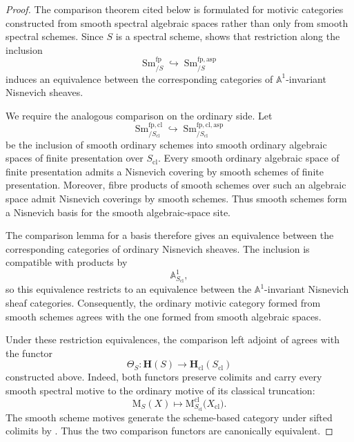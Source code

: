 \begin{proof}
The comparison theorem cited below is formulated for motivic
categories constructed from smooth spectral algebraic spaces rather
than only from smooth spectral schemes.  Since \(S\) is a spectral
scheme,
\cite[Corollary~2.4.5]{KhanBraveNewMotivicI}
shows that restriction along the inclusion
\[
    \operatorname{Sm}^{\mathrm{fp}}_{/S}
    \hookrightarrow
    \operatorname{Sm}^{\mathrm{fp},\mathrm{asp}}_{/S}
\]
induces an equivalence between the corresponding categories of
\(\mathbb A^1\)-invariant Nisnevich sheaves.

We require the analogous comparison on the ordinary side.  Let
\[
    \operatorname{Sm}^{\mathrm{fp},\mathrm{cl}}_{/S_{\mathrm{cl}}}
    \hookrightarrow
    \operatorname{Sm}^{\mathrm{fp},\mathrm{cl},\mathrm{asp}}_
    {/S_{\mathrm{cl}}}
\]
be the inclusion of smooth ordinary schemes into smooth ordinary
algebraic spaces of finite presentation over \(S_{\mathrm{cl}}\).
Every smooth ordinary algebraic space of finite presentation admits a
Nisnevich covering by smooth schemes of finite presentation.  Moreover,
fibre products of smooth schemes over such an algebraic space admit
Nisnevich coverings by smooth schemes.  Thus smooth schemes form a
Nisnevich basis for the smooth algebraic-space site.

The comparison lemma for a basis therefore gives an equivalence between
the corresponding categories of ordinary Nisnevich sheaves.
The inclusion is compatible with products by
\[
    \mathbb A^1_{S_{\mathrm{cl}}},
\]
so this equivalence restricts to an equivalence between the
\(\mathbb A^1\)-invariant Nisnevich sheaf categories.  Consequently, the
ordinary motivic category formed from smooth schemes agrees with the
one formed from smooth algebraic spaces.

Under these restriction equivalences, the comparison left adjoint of
\cite[Corollary~2.7.5]{CisinskiKhanA1Invariance}
agrees with the functor
\[
    \Theta_S
    \colon
    \mathbf H(S)
    \longrightarrow
    \mathbf H_{\mathrm{cl}}(S_{\mathrm{cl}})
\]
constructed above.  Indeed, both functors preserve colimits and carry
every smooth spectral motive to the ordinary motive of its classical
truncation:
\[
    \mathrm M_S(X)
    \longmapsto
    \mathrm M^{\mathrm{cl}}_{S_{\mathrm{cl}}}
    \bigl(
        X_{\mathrm{cl}}
    \bigr).
\]
The smooth scheme motives generate the scheme-based category under
sifted colimits by
.
Thus the two comparison functors are canonically equivalent.


\end{proof}
